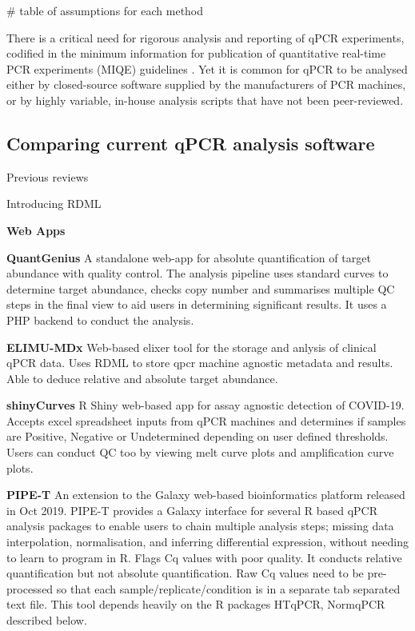 \documentclass{SBCbookchapter}
\begin{document}
# table of assumptions for each method

There is a critical need for rigorous analysis and reporting of qPCR experiments, codified in the minimum information for publication of quantitative real-time PCR experiments (MIQE) guidelines \cite{Bustin2009, Bustin2017, Courts2019}. Yet it is common for qPCR to be analysed either by closed-source software supplied by the manufacturers of PCR machines, or by highly variable, in-house analysis scripts that have not been peer-reviewed.



\subsection{Comparing current qPCR analysis software}

Previous reviews \cite{Rodiger2015, Pabinger2014}

Introducing RDML \cite{Rodiger2017}



\textbf{Web Apps}

\textbf{QuantGenius} A standalone web-app for absolute quantification of target abundance with quality control. The analysis pipeline uses standard curves to determine target abundance, checks copy number and summarises multiple QC steps in the final view to aid users in determining significant results. It uses a PHP backend to conduct the analysis.   \cite{Baebler2017}

\textbf{ELIMU-MDx} Web-based elixer tool for the storage and anlysis of clinical qPCR data. Uses RDML to store qpcr machine agnostic metadata and results. Able to deduce relative and absolute target abundance.  \cite{Krahenbuhl2019}

\textbf{shinyCurves} R Shiny web-based app for assay agnostic detection of COVID-19. Accepts excel spreadsheet inputs from qPCR machines and determines if samples are Positive, Negative or Undetermined depending on user defined thresholds. Users can conduct QC too by viewing melt curve plots and amplification curve plots. \cite{OlaecheaLazaro2021}

\textbf{PIPE-T} An extension to the Galaxy web-based bioinformatics platform released in Oct 2019. PIPE-T provides a Galaxy interface for several R based qPCR analysis packages to enable users to chain multiple analysis steps; missing data interpolation, normalisation, and inferring differential expression, without needing to learn to program in R. Flags Cq values with poor quality. It conducts relative quantification but not absolute quantification. Raw Cq values need to be pre-processed so that each sample/replicate/condition is in a separate tab separated text file.  This tool depends heavily on the R packages HTqPCR, NormqPCR described below. \cite{Zanardi2019}
\end{document}

